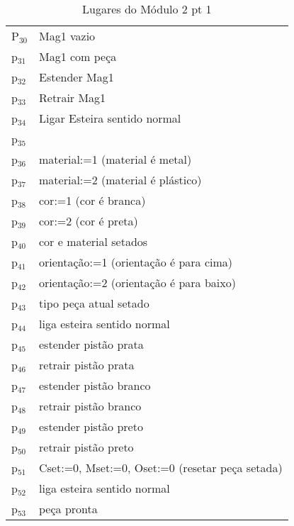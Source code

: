 \documentclass[11pt]{article}
\begin{document}
\begin{table}[htb]
\caption{Lugares do Módulo 2 pt 1}
\centering
\begin{tabular}{ll}
P$_{\text{30}}$ & Mag1 vazio\\
p$_{\text{31}}$ & Mag1 com peça\\
p$_{\text{32}}$ & Estender Mag1\\
p$_{\text{33}}$ & Retrair Mag1\\
p$_{\text{34}}$ & Ligar Esteira sentido normal\\
p$_{\text{35}}$ & \\
p$_{\text{36}}$ & material:=1 (material é metal)\\
p$_{\text{37}}$ & material:=2 (material é plástico)\\
p$_{\text{38}}$ & cor:=1 (cor é branca)\\
p$_{\text{39}}$ & cor:=2 (cor é preta)\\
p$_{\text{40}}$ & cor e material setados\\
p$_{\text{41}}$ & orientação:=1 (orientação é para cima)\\
p$_{\text{42}}$ & orientação:=2 (orientação é para baixo)\\
p$_{\text{43}}$ & tipo peça atual setado\\
p$_{\text{44}}$ & liga esteira sentido normal\\
p$_{\text{45}}$ & estender pistão prata\\
p$_{\text{46}}$ & retrair pistão prata\\
p$_{\text{47}}$ & estender pistão branco\\
p$_{\text{48}}$ & retrair pistão branco\\
p$_{\text{49}}$ & estender pistão preto\\
p$_{\text{50}}$ & retrair pistão preto\\
p$_{\text{51}}$ & Cset:=0, Mset:=0, Oset:=0 (resetar peça setada)\\
p$_{\text{52}}$ & liga esteira sentido normal\\
p$_{\text{53}}$ & peça pronta\\
\end{tabular}
\end{table}
\end{document}
